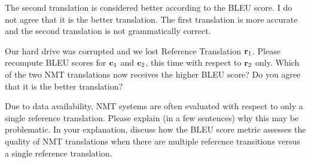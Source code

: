 \begin{parts}
\begin{subparts}
{            The second translation is considered better according to the BLEU score. 
            I do not agree that it is the better translation. 
            The first translation is more accurate and the second translation is not grammatically correct.
        }
        
        \subpart[5] Our hard drive was corrupted and we lost Reference Translation $\mathbf{r}_1$. Please recompute BLEU scores for $\mathbf{c}_1$ and $\mathbf{c}_2$, this time with respect to $\mathbf{r}_2$ only. Which of the two NMT translations now receives the higher BLEU score? Do you agree that it is the better translation?
        
        
        \subpart[2] Due to data availability, NMT systems are often evaluated with respect to only a single reference translation. Please explain (in a few sentences) why this may be problematic. In your explanation, discuss how the BLEU score metric assesses the quality of NMT translations when there are multiple reference transitions versus a single reference translation.
        

\end{subparts}
\end{parts}
